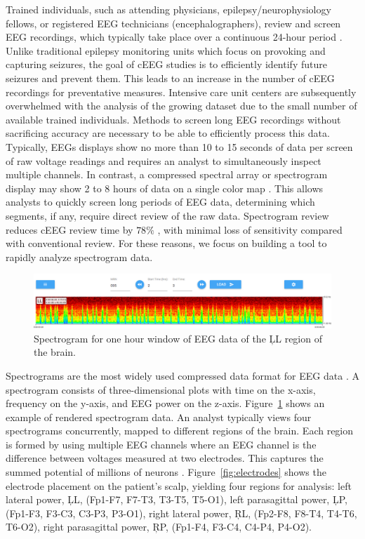 Trained individuals, such as attending physicians, epilepsy/neurophysiology
fellows, or registered EEG technicians (encephalographers), review and screen
EEG recordings, which typically take place over a continuous 24-hour period
\cite{ceeg-3}. Unlike traditional epilepsy monitoring units which focus on
provoking and capturing seizures, the goal of cEEG studies is to efficiently
identify future seizures and prevent them. This leads to an increase in the
number of cEEG recordings for preventative measures. Intensive care unit
centers are subsequently overwhelmed with the analysis of the growing dataset
due to the small number of available trained individuals. Methods to screen
long EEG recordings without sacrificing accuracy are necessary to be able to
efficiently process this data. \\

Typically, EEGs displays show no more than 10 to 15 seconds of data per screen
of raw voltage readings and requires an analyst to simultaneously inspect
multiple channels. In contrast, a compressed spectral array \cite{csa} or
spectrogram display may show 2 to 8 hours of data on a single color map
\cite{ceeg-3}. This allows analysts to quickly screen long periods of EEG data,
determining which segments, if any, require direct review of the raw data.
Spectrogram review reduces cEEG review time by $78\%$ \cite{ceeg-2}, with
minimal loss of sensitivity compared with conventional review. For these
reasons, we focus on building a tool to rapidly analyze spectrogram data. \\

\begin{figure}[h]
\begin{center}
\includegraphics[scale=0.35]{./img/eeg-view.png}
\caption{Spectrogram for one hour window of EEG data of the \c{LL} region of
  the brain.}
\label{fig:eeg-view}
\end{center}
\end{figure}

Spectrograms are the most widely used compressed data format for EEG data
\cite{ceeg-1}. A spectrogram consists of three-dimensional plots with time on
the x-axis, frequency on the y-axis, and EEG power on the z-axis.
Figure~\ref{fig:eeg-view} shows an example of rendered spectrogram data. An
analyst typically views four spectrograms concurrently, mapped to different
regions of the brain. Each region is formed by using multiple EEG channels
where an EEG channel is the difference between voltages measured at two
electrodes. This captures the summed potential of millions of neurons
\cite{eeg-ml}.  Figure~\ref{fig:electrodes} shows the electrode placement on
the patient's scalp, yielding four regions for analysis: left lateral power,
\c{LL}, (Fp1-F7, F7-T3, T3-T5, T5-O1), left parasagittal power, \c{LP},
(Fp1-F3, F3-C3, C3-P3, P3-O1), right lateral power, \c{RL}, (Fp2-F8, F8-T4,
T4-T6, T6-O2), right parasagittal power, \c{RP}, (Fp1-F4, F3-C4, C4-P4, P4-O2).
\\

